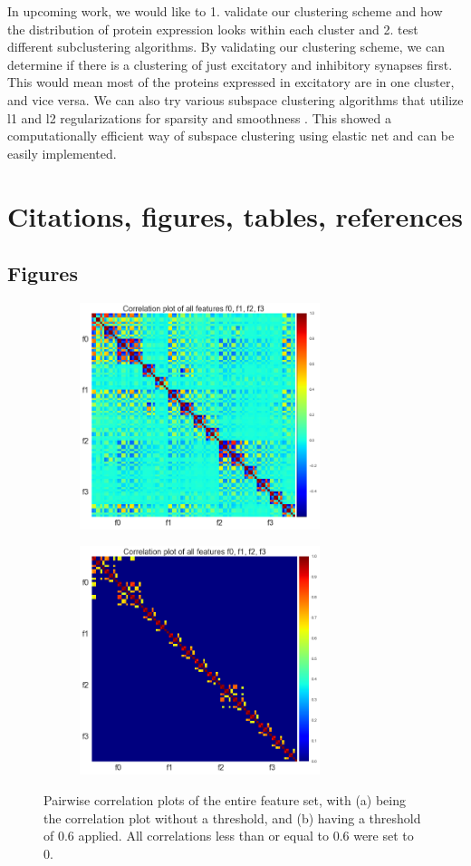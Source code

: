 \documentclass{article}
\begin{document}
In upcoming work, we would like to 1. validate our clustering scheme and how the distribution of protein expression looks within each cluster and 2. test different subclustering algorithms. By validating our clustering scheme, we can determine if there is a clustering of just excitatory and inhibitory synapses first. This would mean most of the proteins expressed in excitatory are in one cluster, and vice versa. We can also try various subspace clustering algorithms that utilize l1 and l2 regularizations for sparsity and smoothness \cite{You}. This showed a computationally efficient way of subspace clustering using elastic net and can be easily implemented.


\newpage
\section{Citations, figures, tables, references}
\label{others}

\FloatBarrier
\subsection{Figures}
\begin{figure}[!htb]
  \centering 
  \begin{subfigure}[b]{0.49\textwidth}
    \includegraphics[width=70mm]{figures/corrplot.png}
    \caption{}
    \label{fig:figure1a}
  \end{subfigure}
  \begin{subfigure}[b]{0.49\textwidth}
    \includegraphics[width=70mm]{figures/thresholdcorrplot.png}
    \caption{}
    \label{fig:figure1b}
  \end{subfigure}
  \caption{Pairwise correlation plots of the entire feature set, with (a) being the correlation plot without a threshold, and (b) having a threshold of 0.6 applied. All correlations less than or equal to 0.6 were set to 0.}
  \label{fig:figure1}
\end{figure}
\end{document}
